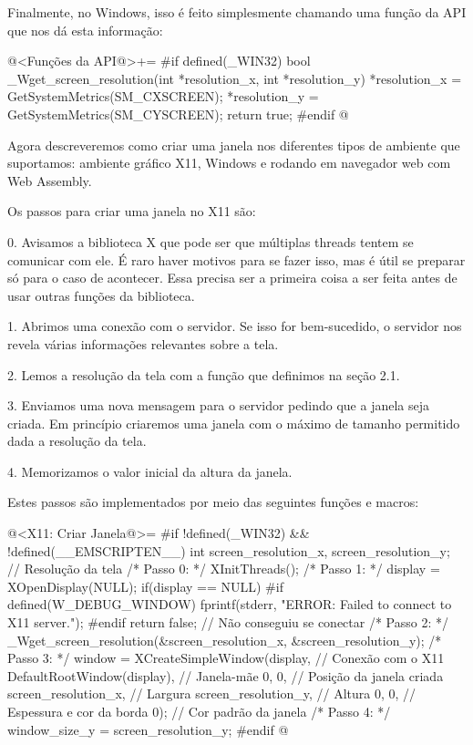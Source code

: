 Finalmente, no Windows, isso é feito simplesmente chamando uma função
da API que nos dá esta informação:

\iniciocodigo
@<Funções da API@>+=
#if defined(_WIN32)
bool _Wget_screen_resolution(int *resolution_x, int *resolution_y){
  *resolution_x = GetSystemMetrics(SM_CXSCREEN);
  *resolution_y = GetSystemMetrics(SM_CYSCREEN);
  return true;
}
#endif
@
\fimcodigo


Agora descreveremos como criar uma janela nos diferentes tipos de
ambiente que suportamos: ambiente gráfico X11, Windows e rodando em
navegador web com Web Assembly.


Os passos para criar uma janela no X11 são:

0. Avisamos a biblioteca X que pode ser que múltiplas threads tentem
se comunicar com ele. É raro haver motivos para se fazer isso, mas é
útil se preparar só para o caso de acontecer. Essa precisa ser a
primeira coisa a ser feita antes de usar outras funções da biblioteca.

1. Abrimos uma conexão com o servidor. Se isso for bem-sucedido, o
servidor nos revela várias informações relevantes sobre a tela.

2. Lemos a resolução da tela com a função que definimos na seção 2.1.

3. Enviamos uma nova mensagem para o servidor pedindo que a janela
seja criada. Em princípio criaremos uma janela com o máximo de tamanho
permitido dada a resolução da tela.

4. Memorizamos o valor inicial da altura da janela.

Estes passos são implementados por meio das seguintes funções e
macros:

\iniciocodigo
@<X11: Criar Janela@>=
#if !defined(_WIN32) && !defined(__EMSCRIPTEN__)
int screen_resolution_x, screen_resolution_y; // Resolução da tela
/* Passo 0: */
XInitThreads();
/* Passo 1: */
display = XOpenDisplay(NULL);
if(display == NULL){
#if defined(W_DEBUG_WINDOW)
  fprintf(stderr, "ERROR: Failed to connect to X11 server.\n");
#endif
  return false; // Não conseguiu se conectar
}
/* Passo 2: */
_Wget_screen_resolution(&screen_resolution_x, &screen_resolution_y);
/* Passo 3: */
window = XCreateSimpleWindow(display, // Conexão com o X11
                             DefaultRootWindow(display), // Janela-mãe
                             0, 0, // Posição da janela criada
                             screen_resolution_x, // Largura
                             screen_resolution_y, // Altura
                             0, 0, // Espessura e cor da borda
                             0); // Cor padrão da janela
/* Passo 4: */
window_size_y =  screen_resolution_y;
#endif
@
\fimcodigo

